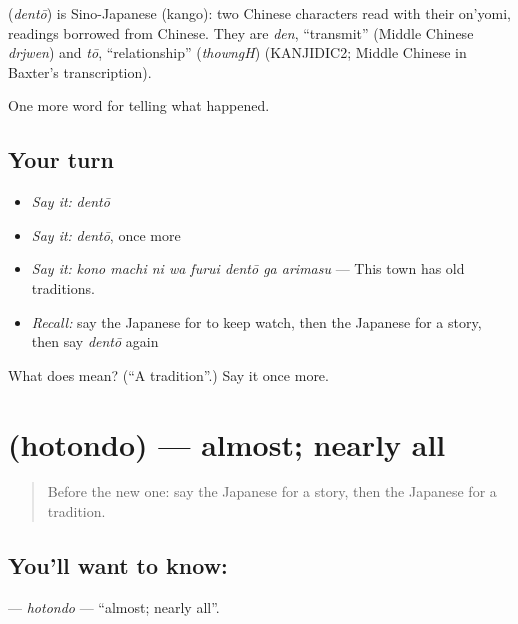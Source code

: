 \begin{cousinweb}
\textbf{} (\emph{dentō}) is Sino-Japanese (kango): two Chinese characters read with their on'yomi, readings borrowed from Chinese. They are \emph{den}, \textquotedblleft{}transmit\textquotedblright{} (Middle Chinese \emph{drjwen}) and \emph{tō}, \textquotedblleft{}relationship\textquotedblright{} (\emph{thowngH}) (KANJIDIC2; Middle Chinese in Baxter's transcription).
\end{cousinweb}

\begin{grammarlens}[title={What you've built}]
One more word for telling what happened.
\end{grammarlens}

\subsection*{Your turn}
\begin{itemize}
\raggedright
  \item \emph{Say it:} \emph{dentō}
  \item \emph{Say it:} \emph{dentō}, once more
  \item \emph{Say it:} \emph{kono machi ni wa furui dentō ga arimasu} — This town has old traditions.
  \item \emph{Recall:} say the Japanese for to keep watch, then the Japanese for a story, then say \emph{dentō} again
\end{itemize}

\begin{tcolorbox}[breakable,colback=teal!4,colframe=teal!35!black,title={Before you move on}]
What does  mean? (\textquotedblleft{}A tradition\textquotedblright{}.) Say it once more.
\end{tcolorbox}
\section[\texorpdfstring{\ja{ほとんど} (hotondo)}{ほとんど (hotondo)}]{ (hotondo) — almost; nearly all}

\label{lesson:JA-C316-hotondo}



\begin{quote}
Before the new one: say the Japanese for a story, then the Japanese for a tradition.
\end{quote}

\subsection*{You'll want to know: }
\textbf{} — \emph{hotondo} — \textquotedblleft{}almost; nearly all\textquotedblright{}.

